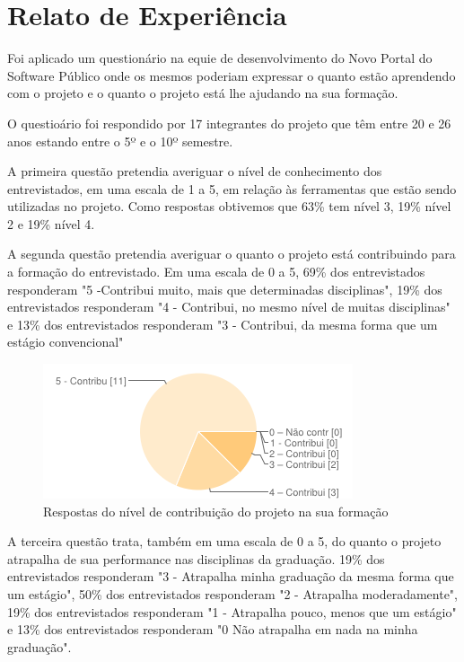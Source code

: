 \section{Relato de Experiência}
\label{sec:estudo}

Foi aplicado um questionário na equie de desenvolvimento do Novo Portal do Software Público onde os mesmos poderiam expressar o quanto estão aprendendo com o projeto e o quanto o projeto está lhe ajudando na sua formação.

O questioário foi respondido por 17 integrantes do projeto que têm entre 20 e 26 anos estando entre o 5º e o 10º semestre.

A primeira questão pretendia averiguar o nível de conhecimento dos entrevistados, em uma escala de 1 a 5, em relação às ferramentas que estão sendo utilizadas no projeto. Como respostas obtivemos que 63\% tem nível 3, 19\% nível 2 e 19\% nível 4.

A segunda questão pretendia averiguar o quanto o projeto está contribuindo para a formação do entrevistado. Em uma escala de 0 a 5, 69\% dos entrevistados responderam "5 -Contribui muito, mais que determinadas disciplinas", 19\% dos entrevistados responderam "4 - Contribui, no mesmo nível de muitas disciplinas" e 13\% dos entrevistados responderam "3 - Contribui, da mesma forma que um estágio convencional"

\begin{figure}[htpb]
  \begin{center}
    \includegraphics[width=.37\textwidth]{images/chart1.png}
  \end{center}
  \caption{Respostas do nível de contribuição do projeto na sua formação}
  \label{fig:core_concurrent}
\end{figure} 

A terceira questão trata, também em uma escala de 0 a 5, do quanto o projeto atrapalha de sua performance nas disciplinas da graduação. 19\% dos entrevistados responderam "3 - Atrapalha minha graduação da mesma forma que um estágio", 50\% dos entrevistados responderam "2 - Atrapalha moderadamente", 19\% dos entrevistados responderam "1 - Atrapalha pouco, menos que um estágio" e 13\% dos entrevistados responderam "0  Não atrapalha em nada na minha graduação".

